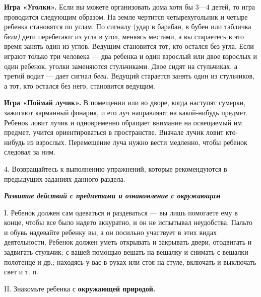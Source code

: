 \documentclass[a5paper]{book}
\renewcommand{\emph}[1]{\textit{#1}}
\begin{document}
\textbf{Игра «Уголки».} Если вы можете организовать дома хотя бы 3---4
детей, то игра проводится следующим образом. На земле чертится
четырехугольник и четыре ребенка становятся по углам. По сигналу (удар в
барабан, в бубен или табличка \emph{беги)} дети перебегают из угла в
угол, меняясь местами, а вы стараетесь в это время занять один из углов.
Ведущим становится тот, кто остался без угла. Если играют только три
человека --- два ребенка и один взрослый или двое взрослых и один
ребенок, уголки заменяются стульчиками. Двое сидят на стульчиках, а
третий водит --- дает сигнал \emph{беги.} Ведущий старается занять один
из стульчиков, а тот, кто остался без него, становится ведущим.

\textbf{Игра «Поймай лучик».} В помещении или во дворе, когда наступят
сумерки, зажигают карманный фонарик, и его луч направляют на
какой-нибудь предмет. Ребенок ловит лучик и одновременно обращает
внимание на освещаемый им предмет, учится ориентироваться в
пространстве. Вначале лучик ловит кто-нибудь из взрослых. Перемещение
луча нужно вести медленно, чтобы ребенок следовал за ним.

4. Возвращайтесь к выполнению упражнений, которые рекомендуются в
предыдущих заданиях данного раздела.

\emph{\textbf{Развитие действий с предметами и ознакомление с
окружающим}}

I. Ребенок должен сам одеваться и раздеваться --- вы лишь помогаете ему
в конце, чтобы все было надето аккуратно, и он не испытывал неудобства.
Пальто и обувь надевайте ребенку вы, а он посильно участвует в этих
видах деятельности. Ребенок должен уметь открывать и закрывать двери,
отодвигать и задвигать стульчик; с вашей помощью вешать на вешалку и
снимать с вешалки полотенце и др.; находясь у вас в руках или стоя на
стуле, включать и выключать свет и т. п.

II. Знакомьте ребенка с \textbf{окружающей природой.}
\end{document}
